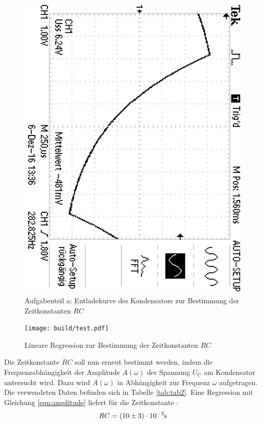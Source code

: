 \begin{figure}
	\centering
	\includegraphics[angle=90]{bilder/F0000TEK.JPG}
	\caption{Aufgabenteil a: Entladekurve des Kondensators zur Bestimmung der Zeitkonstanten $RC$}
	\label{fig:plotrc}
\end{figure}

\begin{figure}
	\centering
	\texttt{[image: build/test.pdf]}
	\caption{Lineare Regression zur Bestimmung der Zeitkonstanten $RC$}
	\label{fig:plota}
\end{figure}


Die Zeitkonstante $RC$ soll nun erneut bestimmt werden, indem die Frequenzabhängigkeit der Amplitude $A(\omega)$ der Spannung $U_\text{C}$ am Kondensator untersucht wird.
Dazu wird $A(\omega)$ in Abhängigkeit zur Frequenz $\omega$ aufgetragen. Die verwendeten Daten befinden sich in Tabelle \ref{tab:tab2}.
Eine Regression mit Gleichung \eqref{eqn:amplitude} liefert für die Zeitkonstante :
\begin{equation*}
	\centering
	RC=(10 \pm 3)\cdot 10^{-3} \si{\second}
\end{equation*}

